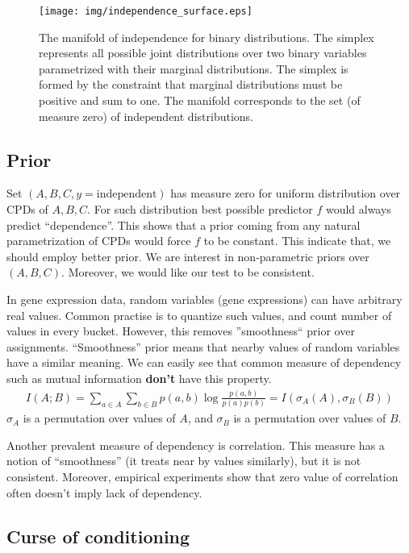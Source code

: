 \documentclass{article} %
\begin{document}
\begin{figure}[h]
\centering
\texttt{[image: img/independence\_surface.eps]}
\caption{The manifold of independence for binary distributions. The simplex represents all possible joint distributions over two binary variables parametrized with their marginal distributions. The simplex is formed by the constraint that marginal distributions must be positive and sum to one.  The manifold corresponds to the set (of measure zero) of independent distributions.}
\label{fig:ind}
\end{figure}

\subsection{Prior}\label{sec:prior}
Set $(A, B, C, y=\text{independent})$ has measure zero for uniform
distribution over CPDs of $A, B, C$. For such distribution
best possible predictor $f$ would always predict ``dependence''. 
This shows that a prior coming from any natural parametrization
of CPDs would force $f$ to be constant. This indicate that, we should
employ better prior. We are interest in non-parametric priors over $(A, B, C)$.
Moreover, we would like our test to be consistent.


In gene expression data, random variables (gene expressions) can 
have arbitrary real values. Common practise is to quantize such values,
and count number of values in every bucket. However, this removes 
''smoothness`` prior over assignments. ``Smoothness'' prior means that
nearby values of random variables have a similar meaning. We can easily see
that common measure of dependency such as mutual information {\bf don't} have 
this property. 
\begin{align*}
  I(A;B)=\sum_{a \in A}\sum_{b \in B} p(a, b)\log{\frac{p(a, b)}{p(a)p(b)}}=I(\sigma_A(A), \sigma_B(B))
\end{align*}
$\sigma_A$ is a permutation over values of $A$, and $\sigma_B$ is
a permutation over values of $B$.



Another prevalent measure of dependency is correlation. This measure
has a notion of ``smoothness'' (it treats near by values similarly), but
it is not consistent. Moreover, empirical experiments show that zero value
of correlation often doesn't imply lack of dependency.


\subsection{Curse of conditioning}\label{sec:curse}
\end{document}
